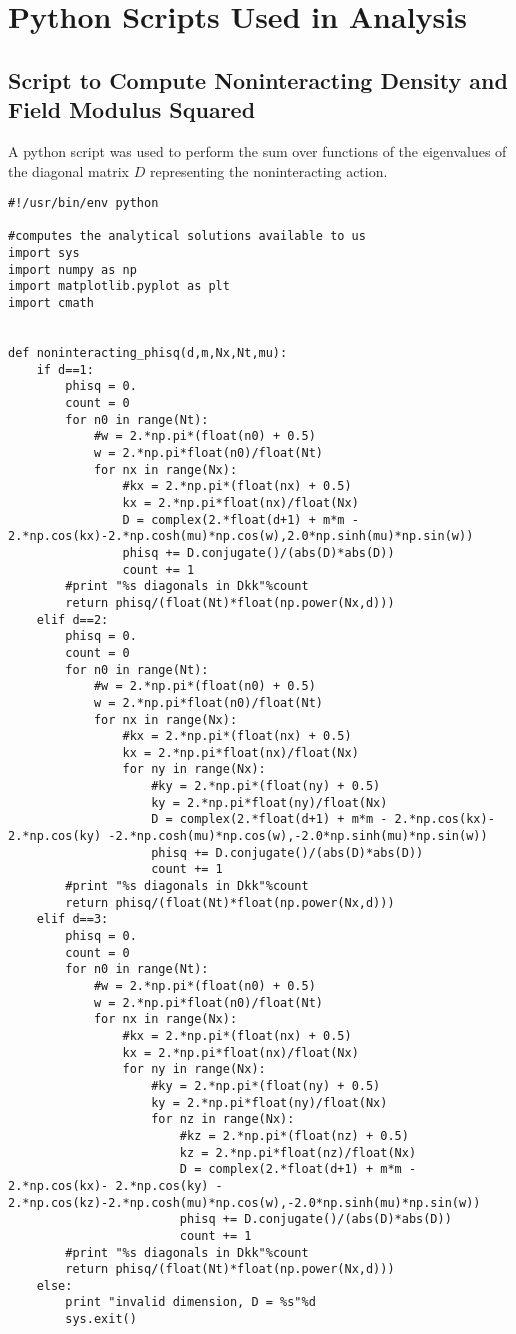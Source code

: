 \documentclass[../../RotatingBosons.tex]{subfiles}
\begin{document}
\section{\label{AartsPythonScripts}Python Scripts Used in Analysis}
\subsection{Script to Compute Noninteracting Density and Field Modulus Squared}
A python script was used to perform the sum over functions of the eigenvalues of the diagonal matrix $D$ representing the noninteracting action.
\lstset{language=python}
\begin{lstlisting}
#!/usr/bin/env python

#computes the analytical solutions available to us
import sys
import numpy as np
import matplotlib.pyplot as plt
import cmath


def noninteracting_phisq(d,m,Nx,Nt,mu):
	if d==1:
		phisq = 0.
		count = 0
		for n0 in range(Nt):
			#w = 2.*np.pi*(float(n0) + 0.5)
			w = 2.*np.pi*float(n0)/float(Nt)
			for nx in range(Nx):
				#kx = 2.*np.pi*(float(nx) + 0.5)
				kx = 2.*np.pi*float(nx)/float(Nx)
				D = complex(2.*float(d+1) + m*m - 2.*np.cos(kx)-2.*np.cosh(mu)*np.cos(w),2.0*np.sinh(mu)*np.sin(w))
				phisq += D.conjugate()/(abs(D)*abs(D))
				count += 1
		#print "%s diagonals in Dkk"%count
		return phisq/(float(Nt)*float(np.power(Nx,d)))
	elif d==2:
		phisq = 0.
		count = 0
		for n0 in range(Nt):
			#w = 2.*np.pi*(float(n0) + 0.5)
			w = 2.*np.pi*float(n0)/float(Nt)
			for nx in range(Nx):
				#kx = 2.*np.pi*(float(nx) + 0.5)
				kx = 2.*np.pi*float(nx)/float(Nx)
				for ny in range(Nx):
					#ky = 2.*np.pi*(float(ny) + 0.5)
					ky = 2.*np.pi*float(ny)/float(Nx)
					D = complex(2.*float(d+1) + m*m - 2.*np.cos(kx)- 2.*np.cos(ky) -2.*np.cosh(mu)*np.cos(w),-2.0*np.sinh(mu)*np.sin(w))
					phisq += D.conjugate()/(abs(D)*abs(D))
					count += 1
		#print "%s diagonals in Dkk"%count
		return phisq/(float(Nt)*float(np.power(Nx,d)))
	elif d==3:
		phisq = 0.
		count = 0
		for n0 in range(Nt):
			#w = 2.*np.pi*(float(n0) + 0.5)
			w = 2.*np.pi*float(n0)/float(Nt)
			for nx in range(Nx):
				#kx = 2.*np.pi*(float(nx) + 0.5)
				kx = 2.*np.pi*float(nx)/float(Nx)
				for ny in range(Nx):
					#ky = 2.*np.pi*(float(ny) + 0.5)
					ky = 2.*np.pi*float(ny)/float(Nx)
					for nz in range(Nx):
						#kz = 2.*np.pi*(float(nz) + 0.5)
						kz = 2.*np.pi*float(nz)/float(Nx)
						D = complex(2.*float(d+1) + m*m - 2.*np.cos(kx)- 2.*np.cos(ky) - 2.*np.cos(kz)-2.*np.cosh(mu)*np.cos(w),-2.0*np.sinh(mu)*np.sin(w))
						phisq += D.conjugate()/(abs(D)*abs(D))
						count += 1
		#print "%s diagonals in Dkk"%count
		return phisq/(float(Nt)*float(np.power(Nx,d)))
	else:
		print "invalid dimension, D = %s"%d
		sys.exit()


\end{lstlisting}
\end{document}
